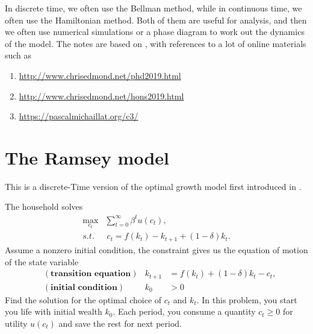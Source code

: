 \documentclass[11pt,a4paper]{book}
\theoremstyle{definition}\newtheorem{definition}{Definition}
\theoremstyle{definition}\newtheorem{fact}{Fact}
\theoremstyle{definition}\newtheorem{remark}{Remark}
\theoremstyle{definition}\newtheorem{ex}{Ex.}
\theoremstyle{definition}\newtheorem{project}{Project}
\theoremstyle{definition}\newtheorem{problem}{Problem}
\theoremstyle{definition}\newtheorem{example}{Example}
\numberwithin{theorem}{section}
\numberwithin{corollary}{chapter}
\numberwithin{assumption}{chapter}
\numberwithin{definition}{chapter}
\numberwithin{prop}{chapter}
\numberwithin{notation}{chapter}
\numberwithin{problem}{chapter}
\numberwithin{example}{chapter}
\numberwithin{fact}{chapter}
\numberwithin{ex}{chapter}
\begin{document}
	In discrete time, we often use the Bellman method, while in continuous time, we often use the Hamiltonian method. Both of them are useful for analysis, and then we often use numerical simulations or a phase diagram to work out the dynamics of the model. The notes are based on \citet{chiang1992element, sydsaeter2008further, heer2009dynamic, campante2021advanced}, with references to a lot of online materials such as 
	\begin{enumerate}
		\item \url{http://www.chrisedmond.net/phd2019.html}
		\item \url{http://www.chrisedmond.net/hons2019.html}
		\item \url{https://pascalmichaillat.org/c3/}
	\end{enumerate}
	
	\section{The Ramsey model}
	This is a discrete-Time version of the optimal growth model first introduced in \citet{ramsey1928mathematical}. 
	
	The household solves
	\begin{align*}
		\max_{c_t} & \sum^\infty_{t=0} \beta^t u(c_t), \\
		s.t. &\ c_t = f(k_t) - k_{t+1} + (1-\delta) k_t.
	\end{align*}
	Assume a nonzero initial condition, the constraint gives us the equation of motion of the state variable
	\begin{align*}
		&(\textbf{transition equation}) & k_{t+1} &= f(k_t) + (1-\delta)k_t - c_t, \\
		&(\textbf{initial condition}) & k_0 &> 0
	\end{align*}
	Find the solution for the optimal choice of $c_t$ and $k_t$. In this problem, you start you life with initial wealth $k_0$. Each period, you consume a quantity $c_t \geq 0$ for utility $u(c_t)$ and save the rest for next period.
	
\end{document}
